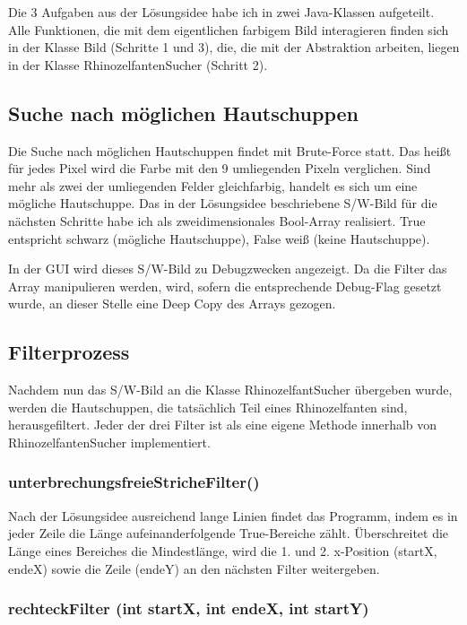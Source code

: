 Die 3 Aufgaben aus der Lösungsidee habe ich in zwei Java-Klassen aufgeteilt. Alle Funktionen, die mit dem eigentlichen farbigem Bild interagieren finden sich in der Klasse Bild (Schritte 1 und 3), die, die mit der Abstraktion arbeiten, liegen in der Klasse RhinozelfantenSucher (Schritt 2).

	\subsection {Suche nach möglichen Hautschuppen}

	Die Suche nach möglichen Hautschuppen findet mit Brute-Force statt. Das heißt für jedes Pixel wird die Farbe mit den 9 umliegenden Pixeln verglichen. Sind mehr als zwei der umliegenden Felder gleichfarbig, handelt es sich um eine mögliche Hautschuppe. Das in der Lösungsidee beschriebene S/W-Bild für die nächsten Schritte habe ich als zweidimensionales Bool-Array realisiert. True entspricht schwarz (mögliche Hautschuppe), False weiß (keine Hautschuppe). 

	In der GUI wird dieses S/W-Bild zu Debugzwecken angezeigt. Da die Filter das Array manipulieren werden, wird, sofern die entsprechende Debug-Flag gesetzt wurde, an dieser Stelle eine Deep Copy des Arrays gezogen.

	\subsection {Filterprozess}
	Nachdem nun das S/W-Bild an die Klasse RhinozelfantSucher übergeben wurde, werden die Hautschuppen, die tatsächlich Teil eines Rhinozelfanten sind, herausgefiltert. Jeder der drei Filter ist als eine eigene Methode innerhalb von RhinozelfantenSucher implementiert.

		\subsubsection{unterbrechungsfreieStricheFilter()}

		Nach der Lösungsidee ausreichend lange Linien findet das Programm, indem es in jeder Zeile die Länge aufeinanderfolgende True-Bereiche zählt. Überschreitet die Länge eines Bereiches die Mindestlänge, wird die 1. und 2. x-Position (startX, endeX) sowie die Zeile (endeY) an den nächsten Filter weitergeben.

		\subsubsection{rechteckFilter (int startX, int endeX, int startY)}

